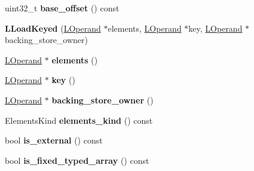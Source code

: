 \begin{DoxyCompactItemize}
\item 
uint32\+\_\+t {\bfseries base\+\_\+offset} () const \hypertarget{classv8_1_1internal_1_1_l_load_keyed_a944c93975338d43236e1a696b686f4a4}{}\label{classv8_1_1internal_1_1_l_load_keyed_a944c93975338d43236e1a696b686f4a4}

\item 
{\bfseries L\+Load\+Keyed} (\hyperlink{classv8_1_1internal_1_1_l_operand}{L\+Operand} $\ast$elements, \hyperlink{classv8_1_1internal_1_1_l_operand}{L\+Operand} $\ast$key, \hyperlink{classv8_1_1internal_1_1_l_operand}{L\+Operand} $\ast$backing\+\_\+store\+\_\+owner)\hypertarget{classv8_1_1internal_1_1_l_load_keyed_ad304d9ea6496224e4a11a6cae2ee335b}{}\label{classv8_1_1internal_1_1_l_load_keyed_ad304d9ea6496224e4a11a6cae2ee335b}

\item 
\hyperlink{classv8_1_1internal_1_1_l_operand}{L\+Operand} $\ast$ {\bfseries elements} ()\hypertarget{classv8_1_1internal_1_1_l_load_keyed_a2fdaa6ebcc228ac46d2a03cffd1468ea}{}\label{classv8_1_1internal_1_1_l_load_keyed_a2fdaa6ebcc228ac46d2a03cffd1468ea}

\item 
\hyperlink{classv8_1_1internal_1_1_l_operand}{L\+Operand} $\ast$ {\bfseries key} ()\hypertarget{classv8_1_1internal_1_1_l_load_keyed_aea9caf0333cbad4a04007bd93e0fb176}{}\label{classv8_1_1internal_1_1_l_load_keyed_aea9caf0333cbad4a04007bd93e0fb176}

\item 
\hyperlink{classv8_1_1internal_1_1_l_operand}{L\+Operand} $\ast$ {\bfseries backing\+\_\+store\+\_\+owner} ()\hypertarget{classv8_1_1internal_1_1_l_load_keyed_abaa0161e1ba4f83060c3bdd5bcf52c44}{}\label{classv8_1_1internal_1_1_l_load_keyed_abaa0161e1ba4f83060c3bdd5bcf52c44}

\item 
Elements\+Kind {\bfseries elements\+\_\+kind} () const \hypertarget{classv8_1_1internal_1_1_l_load_keyed_a59cb1eff8d46bdb1d5d5c59aec4e9f47}{}\label{classv8_1_1internal_1_1_l_load_keyed_a59cb1eff8d46bdb1d5d5c59aec4e9f47}

\item 
bool {\bfseries is\+\_\+external} () const \hypertarget{classv8_1_1internal_1_1_l_load_keyed_a36be60e77b0fbd3241753d7449de092e}{}\label{classv8_1_1internal_1_1_l_load_keyed_a36be60e77b0fbd3241753d7449de092e}

\item 
bool {\bfseries is\+\_\+fixed\+\_\+typed\+\_\+array} () const \hypertarget{classv8_1_1internal_1_1_l_load_keyed_a4bfabc8b862c384fa4cf2d12bbeb40b1}{}\label{classv8_1_1internal_1_1_l_load_keyed_a4bfabc8b862c384fa4cf2d12bbeb40b1}


\end{DoxyCompactItemize}

